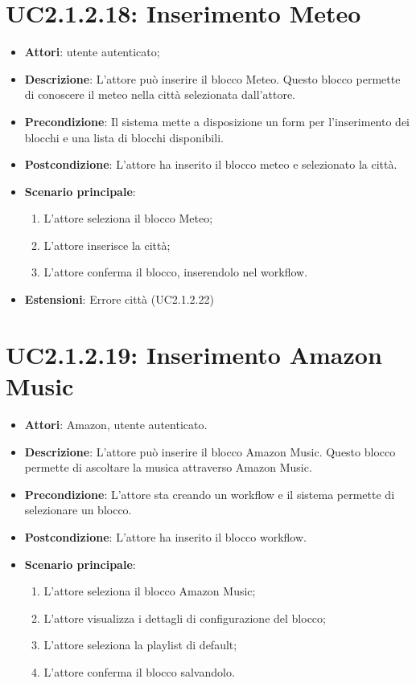 \section{UC2.1.2.18: Inserimento Meteo}
\label{UC2.1.2.18}
\begin{itemize}
	\item \textbf{Attori}: utente autenticato;
	\item \textbf{Descrizione}: L'attore può inserire il blocco Meteo. Questo blocco permette di conoscere il meteo nella città selezionata dall'attore.
	\item \textbf{Precondizione}: Il sistema mette a disposizione un form per l'inserimento dei blocchi e una lista di blocchi disponibili.	
	\item \textbf{Postcondizione}: L'attore ha inserito il blocco meteo e selezionato la città.
	\item \textbf{Scenario principale}:
	\begin{enumerate} \item L'attore seleziona il blocco Meteo;  \item  L'attore inserisce la città; \item L'attore conferma il blocco, inserendolo nel workflow. \end{enumerate}
	\item \textbf{Estensioni}:
	Errore città (UC2.1.2.22)
\end{itemize}

\section{UC2.1.2.19: Inserimento Amazon Music}
\label{UC2.1.2.19}
\begin{itemize}
	\item \textbf{Attori}: Amazon, utente autenticato.
	\item \textbf{Descrizione}: L'attore può inserire il blocco Amazon Music. Questo blocco permette di ascoltare la musica attraverso Amazon Music.
	\item \textbf{Precondizione}: L'attore sta creando un workflow e il sistema permette di selezionare un blocco.	
	\item \textbf{Postcondizione}: L'attore ha inserito il blocco workflow.
	\item \textbf{Scenario principale}:
	\begin{enumerate} \item L'attore seleziona il blocco Amazon Music; \item L'attore visualizza i dettagli di configurazione del blocco;  \item  L'attore seleziona la playlist di default; \item L'attore conferma il blocco salvandolo.\end{enumerate}
\end{itemize}

